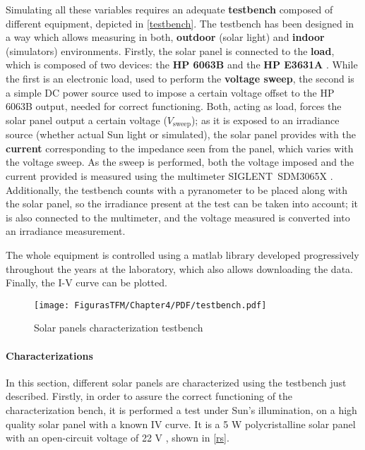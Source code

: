 Simulating all these variables requires an adequate \textbf{testbench} composed of different equipment, depicted in \autoref{testbench}. The testbench has been designed in a way which allows measuring in both, \textbf{outdoor} (solar light) and \textbf{indoor} (simulators) environments. Firstly, the solar panel is connected to the \textbf{load}, which is composed of two devices: the \textbf{HP 6063B} \cite{hpdata1} and the \textbf{HP E3631A} \cite {hpdata2}. While the first is an electronic load, used to perform the \textbf{voltage sweep}, the second is a simple DC power source used to impose a certain voltage offset to the HP 6063B output, needed for correct functioning. Both, acting as load, forces the solar panel output a certain voltage (\textbf{$V_{\text{sweep}}$}); as it is exposed to an irradiance source (whether actual Sun light or simulated), the solar panel provides with the \textbf{current} corresponding to the impedance seen from the panel, which varies with the voltage sweep. As the sweep is performed, both the voltage imposed and the current provided is measured using the multimeter SIGLENT~SDM3065X \cite{siglentmult}. Additionally, the testbench counts with a pyranometer to be placed along with the solar panel, so the irradiance present at the test can be taken into account; it is also connected to the multimeter, and the voltage measured is converted into an irradiance measurement.

The whole equipment is controlled using a \acrshort{matlab} library developed progressively throughout the years at the  laboratory, which also allows downloading the data. Finally, the I-V curve can be plotted.

		\begin{figure} [H]
			\centering
			\texttt{[image: FigurasTFM/Chapter4/PDF/testbench.pdf]}
			\caption{Solar panels characterization testbench} 	\label{testbench}
\end{figure}


\paragraph{Characterizations}

In this section, different solar panels are characterized using the testbench just described. Firstly,  in order to assure the correct functioning of the characterization bench, it is performed a test under Sun's illumination, on a high quality solar panel with a known IV curve. It is a 5 W polycristalline solar panel with an open-circuit voltage of 22 V \cite{panelrs}, shown in \autoref{rs}.

